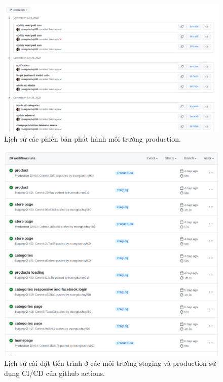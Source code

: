 \FloatBarrier
\begin{figure}[!htbp]\fontsize{13px}{13px}\selectfont
	\begin{center}	
		\includegraphics[width=\textwidth]{./results/commit}
		\caption{Lịch sử các phiên bản phát hành môi trường production.}
	\end{center}
	
\end{figure}
\clearpage
\FloatBarrier
\begin{figure}[!htbp]\fontsize{13px}{13px}\selectfont
	\begin{center}	
		\includegraphics[width=\textwidth]{./results/deployments}
		\caption{Lịch sử cài đặt tiến trình ở các môi trường staging và production sử dụng CI/CD của github actions.}
	\end{center}
	
\end{figure}
